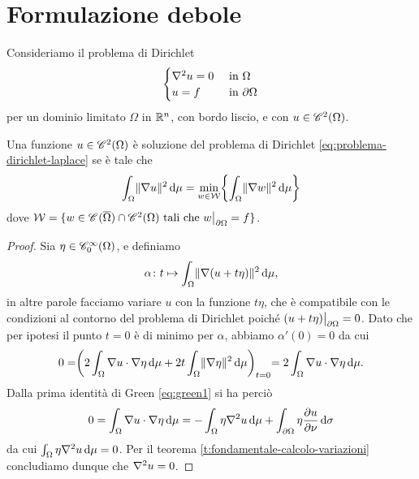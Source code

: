 \section{Formulazione debole}
Consideriamo il problema di Dirichlet
\begin{equation}
    \begin{cases}
        \lap u=0 &\text{ in }\Omega\\
        u=f      &\text{ in }\boundary\Omega
    \end{cases}
    \label{eq:problema-dirichlet-laplace}
\end{equation}
per un dominio limitato $\Omega$ in $\R^n$, con bordo liscio, e con $u\in\cont[2]{\Omega}$.
\begin{teorema} \label{t:problema-dirichlet-laplace-variazionale}
    Una funzione $u\in\cont[2]{\Omega}$ è soluzione del problema di Dirichlet \eqref{eq:problema-dirichlet-laplace} se è tale che
    \begin{equation}
        \int_\Omega\norm{\grad u}^2\,\dd\mu=\min_{w\in\mathcal{W}}\biggl\{\int_\Omega\norm{\grad w}^2\,\dd\mu\biggr\}
    \end{equation}
    dove $\mathcal{W}=\{w\in\cont{\clos{\Omega}}\cap\cont[2]{\Omega}\text{ tali che }w\big|_{\boundary\Omega}=f\}$.
\end{teorema}
\begin{proof}
    Sia $\eta\in\contsc[\infty]{\Omega}$, e definiamo
    \begin{equation}
        \alpha\colon t\mapsto\int_\Omega\norm{\grad(u+t\eta)}^2\,\dd\mu,
    \end{equation}
    in altre parole facciamo variare $u$ con la funzione $t\eta$, che è compatibile con le condizioni al contorno del problema di Dirichlet poich\'e $(u+t\eta)\big|_{\boundary\Omega}=0$.
    Dato che per ipotesi il punto $t=0$ è di minimo per $\alpha$, abbiamo $\alpha'(0)=0$ da cui
    \begin{equation}
        0=
        \biggr(2\int_\Omega\scalar{\grad u}{\grad \eta}\,\dd\mu+2t\int_\Omega\norm{\grad \eta}^2\,\dd\mu\biggl)_{t=0}=
        2\int_\Omega\scalar{\grad u}{\grad\eta}\,\dd\mu.
    \end{equation}
    Dalla prima identità di Green \eqref{eq:green1} si ha perciò
    \begin{equation}
        0=
        \int_\Omega\scalar{\grad u}{\grad\eta}\,\dd\mu=
        -\int_\Omega\eta\lap u\,\dd\mu+\int_{\boundary\Omega}\eta\drp{u}{\nu}\,\dd\sigma
    \end{equation}
    da cui $\int_\Omega\eta\lap u\,\dd\mu=0$.
    Per il teorema \ref{t:fondamentale-calcolo-variazioni} concludiamo dunque che $\lap u=0$.
\end{proof}
